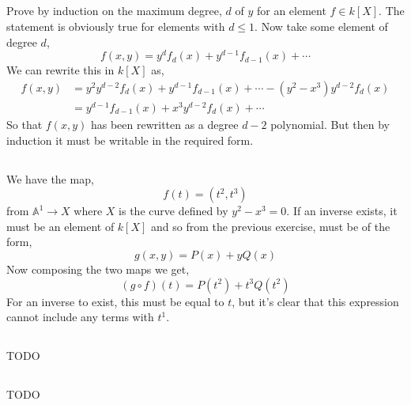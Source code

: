 \documentclass{article}
\begin{document}
\subsection{}
Prove by induction on the maximum degree, \(d\) of \(y\) for an element \(f \in k[X]\). The statement is obviously true for elements with \(d \leq 1\). Now take some element of degree \(d\),
\begin{equation}
f(x, y) = y^{d}f_{d}(x) + y^{d-1}f_{d-1}(x) + \cdots
\end{equation}
We can rewrite this in \(k[X]\) as,
\begin{subequations}
\begin{align}
f(x,y) & =  y^{2}y^{d-2}f_{d}(x) + y^{d-1}f_{d-1}(x) + \cdots - (y^{2}-x^{3})y^{d-2}f_{d}(x) \\
& =  y^{d-1}f_{d-1}(x) + x^{3}y^{d-2}f_{d}(x) + \cdots
\end{align}
\end{subequations}
So that \(f(x,y)\) has been rewritten as a degree \(d-2\) polynomial. But then by induction it must be writable in the required form.

\subsection{}
We have the map,
\begin{equation}
f(t) = (t^{2}, t^{3})
\end{equation}
from \(\mathbb{A}^{1} \to X\) where \(X\) is the curve defined by \(y^{2} - x^{3}=0\). If an inverse exists, it must be an element of \(k[X]\) and so from the previous exercise, must be of the form,
\begin{equation}
g(x, y) = P(x) + yQ(x)
\end{equation}
Now composing the two maps we get,
\begin{equation}
(g\circ f)(t) = P(t^{2}) + t^{3}Q(t^{2})
\end{equation}
For an inverse to exist, this must be equal to \(t\), but it's clear that this expression cannot include any terms with \(t^{1}\).

\subsection{}
TODO

\subsection{}
TODO
\end{document}
